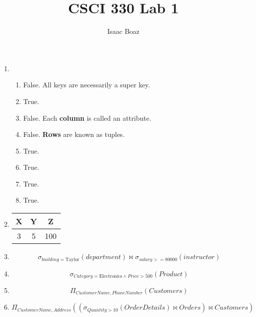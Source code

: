 \documentclass{article}
\title{CSCI 330 Lab 1}
\author{Isaac Boaz}
\begin{document}
\maketitle

\begin{enumerate}
    \item \begin{enumerate}[label=\alph*.]
              \item False. All keys are necessarily a super key.
              \item True.
              \item False. Each \textbf{column} is called an attribute.
              \item False. \textbf{Rows} are known as tuples.
              \item True.
              \item True.
              \item True.
              \item True.
          \end{enumerate}
    \item \begin{tabular}{|c|c|c|}
              \hline
              X & Y & Z   \\
              \hline
              3 & 5 & 100 \\
              \hline
          \end{tabular}
    \item \begin{equation*}
              \sigma_{building=\text{Taylor}}(department) \bowtie \sigma_{salary>=80000}(instructor)
          \end{equation*}
    \item \begin{equation*}
              \sigma_{Category=\text{Electronics}\land Price>500}(Product)
          \end{equation*}
    \item \begin{equation*}
              \Pi_{CustomerName, PhoneNumber}(Customers)
          \end{equation*}
    \item \begin{equation*}
              \Pi_{CustomerName, Address}((\sigma_{Quantity>10}(OrderDetails) \bowtie Orders) \bowtie Customers)
          \end{equation*}
\end{enumerate}
\end{document}

